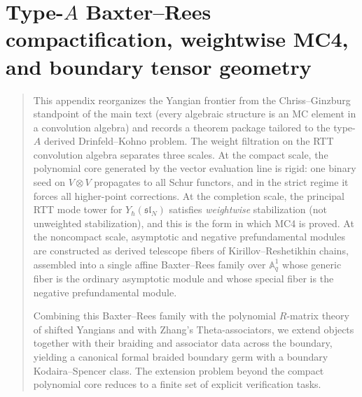 
\chapter{Type-$A$ Baxter--Rees compactification, weightwise MC4, and boundary tensor geometry}
\label{v1-app:typeA-baxter-rees-theta}

\begin{quote}
This appendix reorganizes the Yangian frontier from the Chriss--Ginzburg
standpoint of the main text (every algebraic structure is an MC element
in a convolution algebra) and records a theorem package tailored to the
type-$A$ derived Drinfeld--Kohno problem. The weight filtration on the
RTT convolution algebra separates three scales. At the compact scale, the
polynomial core generated by the vector evaluation line is rigid: one
binary seed on $V\otimes V$ propagates to all Schur functors, and in the
strict regime it forces all higher-point corrections. At the completion
scale, the principal RTT mode tower for $Y_\hbar(\mathfrak{sl}_N)$
satisfies \emph{weightwise} stabilization (not unweighted stabilization),
and this is the form in which MC4 is proved. At the noncompact scale,
asymptotic and negative prefundamental modules are constructed as derived
telescope fibers of Kirillov--Reshetikhin chains, assembled into a single
affine Baxter--Rees family over $\mathbb A^1_q$ whose generic fiber is the
ordinary asymptotic module and whose special fiber is the negative
prefundamental module.

Combining this Baxter--Rees family with the polynomial $R$-matrix theory
of shifted Yangians and with Zhang's Theta-associators, we extend objects
together with their braiding and associator data across the boundary,
yielding a canonical formal braided boundary germ with a boundary
Kodaira--Spencer class. The extension problem beyond the compact
polynomial core reduces to a finite set of explicit verification tasks.
\end{quote}

